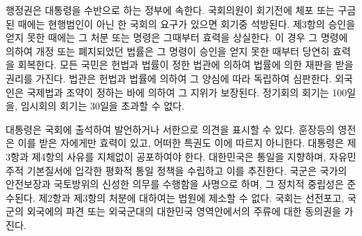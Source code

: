 \documentclass[master, korean]{pnuthesis}
\begin{document}
행정권은 대통령을 수반으로 하는 정부에 속한다. 국회의원이 회기전에 체포 또는 구금된 때에는 현행범인이 아닌 한 국회의 요구가 있으면 회기중 석방된다. 제3항의 승인을 얻지 못한 때에는 그 처분 또는 명령은 그때부터 효력을 상실한다. 이 경우 그 명령에 의하여 개정 또는 폐지되었던 법률은 그 명령이 승인을 얻지 못한 때부터 당연히 효력을 회복한다. 모든 국민은 헌법과 법률이 정한 법관에 의하여 법률에 의한 재판을 받을 권리를 가진다. 법관은 헌법과 법률에 의하여 그 양심에 따라 독립하여 심판한다. 외국인은 국제법과 조약이 정하는 바에 의하여 그 지위가 보장된다. 정기회의 회기는 100일을, 임시회의 회기는 30일을 초과할 수 없다.

대통령은 국회에 출석하여 발언하거나 서한으로 의견을 표시할 수 있다. 훈장등의 영전은 이를 받은 자에게만 효력이 있고, 어떠한 특권도 이에 따르지 아니한다. 대통령은 제3항과 제4항의 사유를 지체없이 공포하여야 한다. 대한민국은 통일을 지향하며, 자유민주적 기본질서에 입각한 평화적 통일 정책을 수립하고 이를 추진한다. 국군은 국가의 안전보장과 국토방위의 신성한 의무를 수행함을 사명으로 하며, 그 정치적 중립성은 준수된다. 제2항과 제3항의 처분에 대하여는 법원에 제소할 수 없다. 국회는 선전포고, 국군의 외국에의 파견 또는 외국군대의 대한민국 영역안에서의 주류에 대한 동의권을 가진다.
\end{document}
